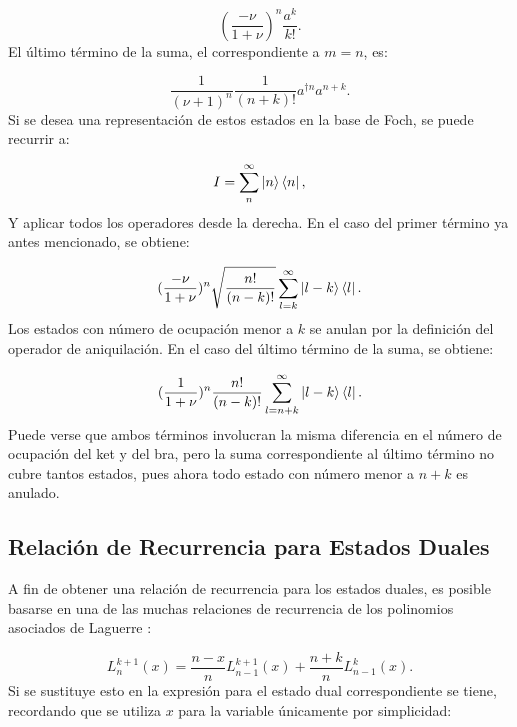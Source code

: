 \documentclass[a4paper,10pt]{report}
\begin{document}
\begin{equation}
(\frac{-\nu}{1+\nu})^n \frac{a^k}{k!}.
\end{equation} El último término de la suma, el correspondiente a $m=n$, es:

\begin{equation}
\frac{1}{(\nu+1)^n} \frac{1}{(n+k)!} a^{\dagger n}a^{n+k}.
\end{equation}Si se desea una representación de estos estados en la base de Foch, se puede recurrir a:

\begin{equation}
I = \sum^\infty _n \Ket{n}\Bra{n},
\end{equation}Y aplicar todos los operadores desde la derecha. En el caso del primer término ya antes mencionado, se obtiene:

\begin{equation}
 (\frac{-\nu}{1+\nu})^n \sqrt{\frac{n!}{(n-k)!}}\sum^\infty _{l=k} \Ket{l-k}\Bra{l}.
\end{equation} Los estados con número de ocupación menor a $k$ se anulan por la definición del operador de aniquilación. En el caso del último término de la suma, se obtiene:

\begin{equation}
(\frac{1}{1+\nu})^n \frac{n!}{(n-k)!}\sum^\infty _{l=n+k} \Ket{l-k}\Bra{l}.
\end{equation} Puede verse que ambos términos involucran la misma diferencia en el número de ocupación del ket y del bra, pero la suma correspondiente al último término no cubre tantos estados, pues ahora todo estado con número menor a $n+k$ es anulado.

\subsection{Relación de Recurrencia para Estados Duales}

A fin de obtener una relación de recurrencia para los estados duales, es posible basarse en una de las muchas relaciones de recurrencia de los polinomios asociados de Laguerre \cite{ArfkenMM}:

\begin{equation}
L_n^{k+1}(x) = \frac{n-x}{n}L_{n-1}^{k+1}(x) + \frac{n+k}{n}L_{n-1}^{k}(x).
\end{equation} Si se sustituye esto en la expresión para el estado dual correspondiente se tiene, recordando que se utiliza $x$ para la variable únicamente por simplicidad:
\end{document}
